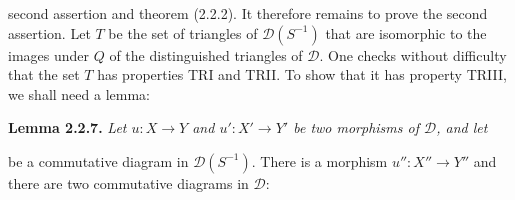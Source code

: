 \clearpage
{}%
\begingroup
\normalsize
\setlength{\parskip}{0pt}%
\setlength{\emergencystretch}{1.5em}%
\setlength{\abovedisplayskip}{1pt plus 1pt minus 1pt}%
\setlength{\belowdisplayskip}{1pt plus 1pt minus 1pt}%

\noindent second assertion and theorem (2.2.2). It therefore remains to prove
the second assertion.
%
Let $T$ be the set of triangles of $\mathcal D(S^{-1})$ that are isomorphic
to the images under $Q$ of the distinguished triangles of $\mathcal D$.
%
One checks without difficulty that the set $T$ has properties TRI and TRII.
To show that it has property TRIII, we shall need a lemma:

\smallskip
\noindent\textbf{Lemma 2.2.7.}\quad
\begingroup\itshape
Let $u\colon X\longrightarrow Y$ and
$u'\colon X'\longrightarrow Y'$ be two morphisms of $\mathcal D$, and let

\begin{center}
\end{center}

\noindent be a commutative diagram in $\mathcal D(S^{-1})$.
%
There is a morphism $u''\colon X''\longrightarrow Y''$ and there are two
commutative diagrams in $\mathcal D$:

